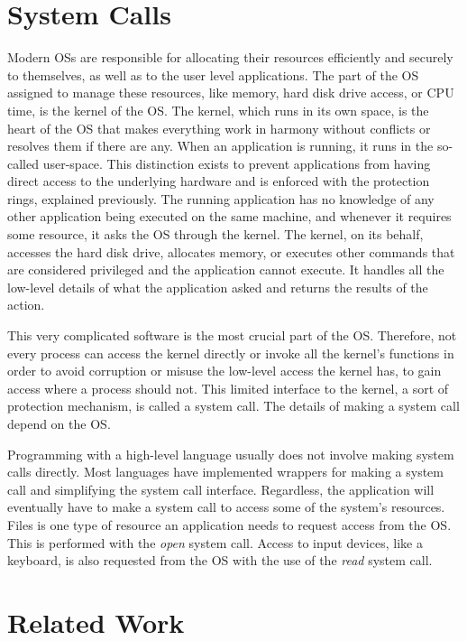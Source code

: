 \section{System Calls}\label{sec:syscalls}
Modern \ac{OS}s are responsible for allocating their resources efficiently and securely to themselves, as well as to the user level applications. The part of the \ac{OS} assigned to manage these resources, like memory, hard disk drive access, or \ac{CPU} time, is the kernel of the \ac{OS}. The kernel, which runs in its own space, is the heart of the \ac{OS} that makes everything work in harmony without conflicts or resolves them if there are any. When an application is running, it runs in the so-called user-space. This distinction exists to prevent applications from having direct access to the underlying hardware and is enforced with the protection rings, explained previously. The running application has no knowledge of any other application being executed on the same machine, and whenever it requires some resource, it asks the \ac{OS} through the kernel. The kernel, on its behalf, accesses the hard disk drive, allocates memory, or executes other commands that are considered privileged and the application cannot execute. It handles all the low-level details of what the application asked and returns the results of the action. 

\par This very complicated software is the most crucial part of the \ac{OS}. Therefore, not every process can access the kernel directly or invoke all the kernel's functions in order to avoid corruption or misuse the low-level access the kernel has, to gain access where a process should not. This limited interface to the kernel, a sort of protection mechanism, is called a system call. The details of making a system call depend on the \ac{OS}.

\par Programming with a high-level language usually does not involve making system calls directly. Most languages have implemented wrappers for making a system call and simplifying the system call interface. Regardless, the application will eventually have to make a system call to access some of the system's resources. Files is one type of resource an application needs to request access from the \ac{OS}. This is performed with the \emph{open} system call. Access to input devices, like a keyboard, is also requested from the \ac{OS} with the use of the \emph{read} system call.

\section{Related Work}\label{sec:related}

